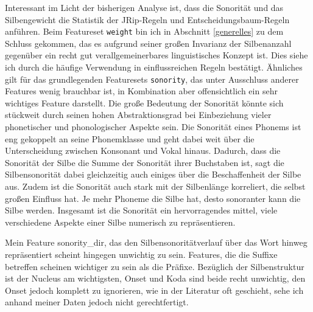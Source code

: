 Interessant im Licht der bisherigen Analyse ist, dass die Sonorität und das Silbengewicht die Statistik der JRip-Regeln und Entscheidungsbaum-Regeln anführen. Beim Featureset \texttt{weight} bin ich in Abschnitt \ref{generelles} zu dem Schluss gekommen, das es aufgrund seiner großen Invarianz der Silbenanzahl gegenüber ein recht gut verallgemeinerbares linguistisches Konzept ist. Dies siehe ich durch die häufige Verwendung in einflussreichen Regeln bestätigt. Ähnliches gilt für das grundlegenden Featuresets \texttt{sonority}, das unter Ausschluss anderer Features wenig brauchbar ist, in Kombination aber offensichtlich ein sehr wichtiges Feature darstellt. Die große Bedeutung der Sonorität könnte sich stückweit durch seinen hohen Abstraktionsgrad bei Einbeziehung vieler phonetischer und phonologischer Aspekte sein. Die Sonorität eines Phonems ist eng gekoppelt an seine Phonemklasse und geht dabei weit über die Unterscheidung zwischen Konsonant und Vokal hinaus. Dadurch, dass die Sonorität der Silbe die Summe der Sonorität ihrer Buchstaben ist, sagt die Silbensonorität dabei gleichzeitig auch einiges über die Beschaffenheit der Silbe aus. Zudem ist die Sonorität auch stark mit der Silbenlänge korreliert, die selbst großen Einfluss hat. Je mehr Phoneme die Silbe hat, desto sonoranter kann die Silbe werden. Insgesamt ist die Sonorität ein hervorragendes mittel, viele verschiedene Aspekte einer Silbe numerisch zu repräsentieren.

Mein Feature sonority\_dir, das den Silbensonoritätverlauf über das Wort hinweg repräsentiert scheint hingegen unwichtig zu sein.
Features, die die Suffixe betreffen scheinen wichtiger zu sein als die Präfixe.
Bezüglich der Silbenstruktur ist der Nucleus am wichtigsten, Onset und Koda sind beide recht unwichtig, den Onset jedoch komplett zu ignorieren, wie in der Literatur oft geschieht, sehe ich anhand meiner Daten jedoch nicht gerechtfertigt.



%
%
%

